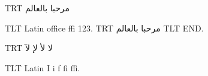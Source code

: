 \documentclass{article}
\begin{document}
\textdir TRT مرحبا بالعالم
\par
\textdir TLT Latin office ffi 123.
\textdir TRT مرحبا بالعالم
\textdir TLT END.
\par
\textdir TRT لا لأ لإ لآ
\par
\textdir TLT Latin I i f fi ffi.
\end{document}
